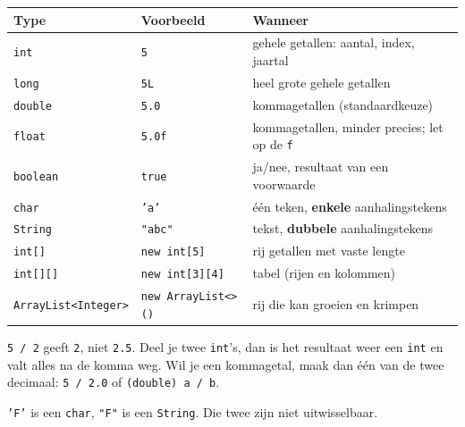 \documentclass[a4paper,11pt]{article}
\begin{document}
\begin{center}
    \begin{tabular}{@{}llp{6.2cm}@{}}
        \toprule
        \textbf{Type}               & \textbf{Voorbeeld}         & \textbf{Wanneer}                                    \\
        \midrule
        \texttt{int}                & \texttt{5}                 & gehele getallen: aantal, index, jaartal             \\
        \texttt{long}               & \texttt{5L}                & heel grote gehele getallen                          \\
        \texttt{double}             & \texttt{5.0}               & kommagetallen (standaardkeuze)                      \\
        \texttt{float}              & \texttt{5.0f}              & kommagetallen, minder precies; let op de \texttt{f} \\
        \texttt{boolean}            & \texttt{true}              & ja/nee, resultaat van een voorwaarde                \\
        \texttt{char}               & \texttt{'a'}               & \'e\'en teken, \textbf{enkele} aanhalingstekens     \\
        \texttt{String}             & \texttt{"abc"}             & tekst, \textbf{dubbele} aanhalingstekens            \\
        \midrule
        \texttt{int[]}              & \texttt{new int[5]}        & rij getallen met vaste lengte                       \\
        \texttt{int[][]}            & \texttt{new int[3][4]}     & tabel (rijen en kolommen)                           \\
        \texttt{ArrayList<Integer>} & \texttt{new ArrayList<>()} & rij die kan groeien en krimpen                      \\
        \bottomrule
    \end{tabular}
\end{center}

\begin{warningbox}
    \texttt{5 / 2} geeft \texttt{2}, niet \texttt{2.5}. Deel je twee \texttt{int}'s,
    dan is het resultaat weer een \texttt{int} en valt alles na de komma weg. Wil je
    een kommagetal, maak dan \'e\'en van de twee decimaal:
    \texttt{5 / 2.0} of \texttt{(double) a / b}.

    \medskip
    \texttt{'F'} is een \texttt{char}, \texttt{"F"} is een \texttt{String}. Die twee
    zijn niet uitwisselbaar.
\end{warningbox}
\end{document}
